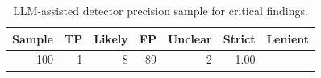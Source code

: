 \begin{table}[t]
    \centering
    \caption{LLM-assisted detector precision sample for critical findings.}
    \label{tab:detector-precision}
    \begin{tabular}{rrrrrrr}
        \toprule
        Sample & TP & Likely & FP & Unclear & Strict & Lenient \\
        \midrule
        100 & 1 & 8 & 89 & 2 & 1.00%
        \bottomrule
    \end{tabular}
\end{table}
